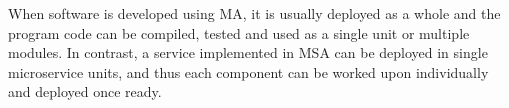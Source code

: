
\begin{sloppypar}
    When software is developed using MA, it is usually deployed as a whole and 
    the program code can be compiled, tested and used as a single unit or 
    multiple modules. In contrast, a service implemented in MSA 
    can be deployed in single microservice units, and thus each component can 
    be worked upon individually and deployed once ready. 
\end{sloppypar}
